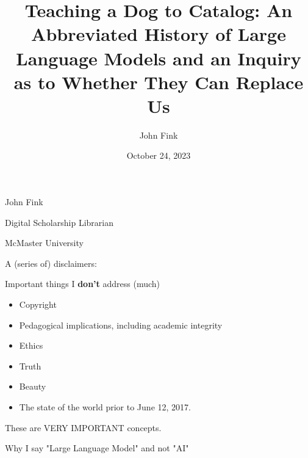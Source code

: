 \documentclass{beamer}
\title{Teaching a Dog to Catalog: An Abbreviated History of Large Language Models and an Inquiry as to Whether They Can Replace Us}
\author{John Fink}
\institute{McMaster University}
\date{October 24, 2023}
\begin{document}
\begin{frame}
    \maketitle
\end{frame}

\begin{frame}
	John Fink
	
	Digital Scholarship Librarian
	
	McMaster University
\end{frame}




\begin{frame}
	A (series of) disclaimers:
\end{frame}
 
 

 \begin{frame}[plain]
 \end{frame}

\begin{frame}{Important things I \textbf{don't} address (much)}
	\begin{itemize}
		\item Copyright
		\pause
		\item Pedagogical implications, including academic integrity
		\pause
		\item Ethics
		\pause
		\item Truth
		\pause
		\item Beauty
		\pause
		\item The state of the world prior to June 12, 2017.
	\end{itemize}
\end{frame}

\begin{frame}
	These are VERY IMPORTANT concepts.
\end{frame}

\begin{frame}
	Why I say "Large Language Model" and not "AI"
\end{frame}
\end{document}
